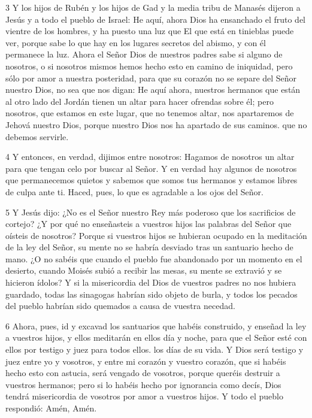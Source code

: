 \par 3 Y los hijos de Rubén y los hijos de Gad y la media tribu de Manasés dijeron a Jesús y a todo el pueblo de Israel: He aquí, ahora Dios ha ensanchado el fruto del vientre de los hombres, y ha puesto una luz que El que está en tinieblas puede ver, porque sabe lo que hay en los lugares secretos del abismo, y con él permanece la luz. Ahora el Señor Dios de nuestros padres sabe si alguno de nosotros, o si nosotros mismos hemos hecho esto en camino de iniquidad, pero sólo por amor a nuestra posteridad, para que su corazón no se separe del Señor nuestro Dios, no sea que nos digan: He aquí ahora, nuestros hermanos que están al otro lado del Jordán tienen un altar para hacer ofrendas sobre él; pero nosotros, que estamos en este lugar, que no tenemos altar, nos apartaremos de Jehová nuestro Dios, porque nuestro Dios nos ha apartado de sus caminos. que no debemos servirle.

\par 4 Y entonces, en verdad, dijimos entre nosotros: Hagamos de nosotros un altar para que tengan celo por buscar al Señor. Y en verdad hay algunos de nosotros que permanecemos quietos y sabemos que somos tus hermanos y estamos libres de culpa ante ti. Haced, pues, lo que es agradable a los ojos del Señor.

\par 5 Y Jesús dijo: ¿No es el Señor nuestro Rey más poderoso que los sacrificios de cortejo? ¿Y por qué no enseñasteis a vuestros hijos las palabras del Señor que oísteis de nosotros? Porque si vuestros hijos se hubieran ocupado en la meditación de la ley del Señor, su mente no se habría desviado tras un santuario hecho de mano. ¿O no sabéis que cuando el pueblo fue abandonado por un momento en el desierto, cuando Moisés subió a recibir las mesas, su mente se extravió y se hicieron ídolos? Y si la misericordia del Dios de vuestros padres no nos hubiera guardado, todas las sinagogas habrían sido objeto de burla, y todos los pecados del pueblo habrían sido quemados a causa de vuestra necedad.

\par 6 Ahora, pues, id y excavad los santuarios que habéis construido, y enseñad la ley a vuestros hijos, y ellos meditarán en ellos día y noche, para que el Señor esté con ellos por testigo y juez para todos ellos. los días de su vida. Y Dios será testigo y juez entre yo y vosotros, y entre mi corazón y vuestro corazón, que si habéis hecho esto con astucia, será vengado de vosotros, porque queréis destruir a vuestros hermanos; pero si lo habéis hecho por ignorancia como decís, Dios tendrá misericordia de vosotros por amor a vuestros hijos. Y todo el pueblo respondió: Amén, Amén.

